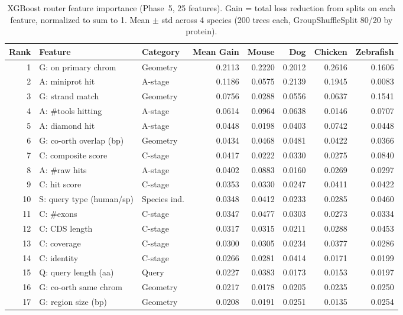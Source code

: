 \begin{table}[t]
\centering
\caption{XGBoost router feature importance (Phase~5, 25 features). Gain = total loss reduction from splits on each feature, normalized to sum to 1. Mean $\pm$ std across 4 species (200 trees each, GroupShuffleSplit 80/20 by protein).}
\label{tab:s3_feature_importance}
\scriptsize
\setlength{\tabcolsep}{2pt}
\begin{tabular}{rllrrrrr}
\toprule
Rank & Feature & Category & Mean Gain & Mouse & Dog & Chicken & Zebrafish \\
\midrule
1 & G: on primary chrom & Geometry & 0.2113 & 0.2220 & 0.2012 & 0.2616 & 0.1606 \\
2 & A: miniprot hit & A-stage & 0.1186 & 0.0575 & 0.2139 & 0.1945 & 0.0083 \\
3 & G: strand match & Geometry & 0.0756 & 0.0288 & 0.0556 & 0.0637 & 0.1541 \\
4 & A: \#tools hitting & A-stage & 0.0614 & 0.0964 & 0.0638 & 0.0146 & 0.0707 \\
5 & A: diamond hit & A-stage & 0.0448 & 0.0198 & 0.0403 & 0.0742 & 0.0448 \\
6 & G: co-orth overlap (bp) & Geometry & 0.0434 & 0.0468 & 0.0481 & 0.0422 & 0.0366 \\
7 & C: composite score & C-stage & 0.0417 & 0.0222 & 0.0330 & 0.0275 & 0.0840 \\
8 & A: \#raw hits & A-stage & 0.0402 & 0.0883 & 0.0160 & 0.0269 & 0.0297 \\
9 & C: hit score & C-stage & 0.0353 & 0.0330 & 0.0247 & 0.0411 & 0.0422 \\
10 & S: query type (human/sp) & Species ind. & 0.0348 & 0.0412 & 0.0233 & 0.0285 & 0.0460 \\
11 & C: \#exons & C-stage & 0.0347 & 0.0477 & 0.0303 & 0.0273 & 0.0334 \\
12 & C: CDS length & C-stage & 0.0317 & 0.0315 & 0.0211 & 0.0288 & 0.0453 \\
13 & C: coverage & C-stage & 0.0300 & 0.0305 & 0.0234 & 0.0377 & 0.0286 \\
14 & C: identity & C-stage & 0.0266 & 0.0281 & 0.0414 & 0.0171 & 0.0199 \\
15 & Q: query length (aa) & Query & 0.0227 & 0.0383 & 0.0173 & 0.0153 & 0.0197 \\
16 & G: co-orth same chrom & Geometry & 0.0217 & 0.0178 & 0.0205 & 0.0235 & 0.0250 \\
17 & G: region size (bp) & Geometry & 0.0208 & 0.0191 & 0.0251 & 0.0135 & 0.0254 \\

\end{tabular}
\end{table}
